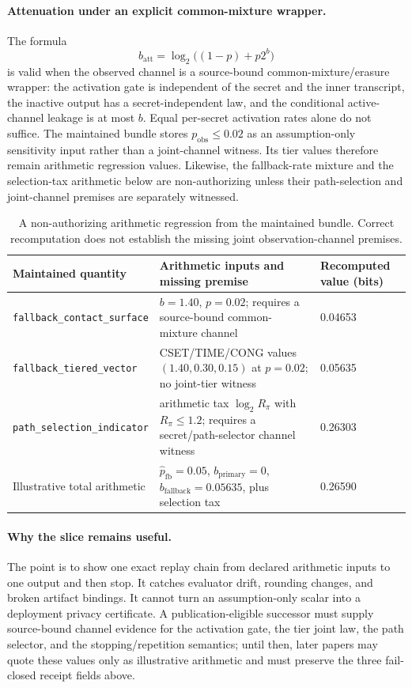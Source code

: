 \documentclass[11pt]{article}
\begin{document}
\paragraph{Attenuation under an explicit common-mixture wrapper.}
The formula
\[
b_{\mathrm{att}}=\log_2\!\big((1-p)+p2^b\big)
\]
is valid when the observed channel is a source-bound common-mixture/erasure wrapper: the activation gate is independent of the secret and the inner transcript, the inactive output has a secret-independent law, and the conditional active-channel leakage is at most $b$. Equal per-secret activation rates alone do not suffice.
The maintained bundle stores $p_{\mathrm{obs}}\le0.02$ as an assumption-only sensitivity input rather than a joint-channel witness. Its tier values therefore remain arithmetic regression values. Likewise, the fallback-rate mixture and the selection-tax arithmetic below are non-authorizing unless their path-selection and joint-channel premises are separately witnessed.

\begin{table}[t]
\centering
\small
\begin{tabularx}{0.96\linewidth}{@{}Y Y Y@{}}
\toprule
Maintained quantity & Arithmetic inputs and missing premise & Recomputed value (bits)\\
\midrule
\texttt{fallback\_contact\_surface} & $b=1.40$, $p=0.02$; requires a source-bound common-mixture channel & 0.04653\\
\texttt{fallback\_tiered\_vector} & CSET/TIME/CONG values $(1.40,0.30,0.15)$ at $p=0.02$; no joint-tier witness & 0.05635\\
\texttt{path\_selection\_indicator} & arithmetic tax $\log_2 R_{\pi}$ with $R_{\pi}\le1.2$; requires a secret/path-selector channel witness & 0.26303\\
Illustrative total arithmetic & $\widehat p_{\mathrm{fb}}=0.05$, $b_{\mathrm{primary}}=0$, $b_{\mathrm{fallback}}=0.05635$, plus selection tax & 0.26590\\
\bottomrule
\end{tabularx}
\caption{A non-authorizing arithmetic regression from the maintained bundle. Correct recomputation does not establish the missing joint observation-channel premises.}
\label{tab:workedexample-bundle-backed-slice}
\end{table}

\paragraph{Why the slice remains useful.}
The point is to show one exact replay chain from declared arithmetic inputs to one output and then stop. It catches evaluator drift, rounding changes, and broken artifact bindings. It cannot turn an assumption-only scalar into a deployment privacy certificate. A publication-eligible successor must supply source-bound channel evidence for the activation gate, the tier joint law, the path selector, and the stopping/repetition semantics; until then, later papers may quote these values only as illustrative arithmetic and must preserve the three fail-closed receipt fields above.\cite{series:fallbacktax,series:traceifaces,series:stataudit,series:anytimespend}
\end{document}

